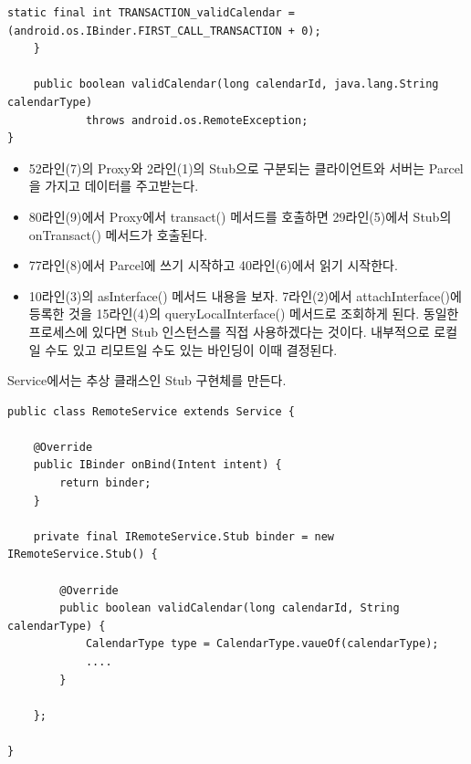 \begin{lstlisting}[frame=single]
		static final int TRANSACTION_validCalendar = (android.os.IBinder.FIRST_CALL_TRANSACTION + 0);
	}

	public boolean validCalendar(long calendarId, java.lang.String calendarType)
			throws android.os.RemoteException;
}
\end{lstlisting}
\begin{itemize}
\item 52라인(7)의 Proxy와 2라인(1)의 Stub으로 구분되는 클라이언트와 서버는 Parcel을 가지고 데이터를 주고받는다. 
\item 80라인(9)에서 Proxy에서 transact() 메서드를 호출하면 29라인(5)에서 Stub의 onTransact() 메서드가 호출된다.
\item 77라인(8)에서 Parcel에 쓰기 시작하고 40라인(6)에서 읽기 시작한다.
\item 10라인(3)의 asInterface() 메서드 내용을 보자. 7라인(2)에서 attachInterface()에 등록한 것을 15라인(4)의 queryLocalInterface() 메서드로 조회하게 된다. 동일한 프로세스에 있다면 Stub 인스턴스를 직접 사용하겠다는 것이다. 내부적으로 로컬일 수도 있고 리모트일 수도 있는 바인딩이 이때 결정된다.
\end{itemize}

Service에서는 추상 클래스인 Stub 구현체를 만든다.
\begin{lstlisting}[frame=single]
public class RemoteService extends Service {

 	@Override
    public IBinder onBind(Intent intent) {
		return binder;
	}
    	
	private final IRemoteService.Stub binder = new IRemoteService.Stub() {
	
		@Override
        public boolean validCalendar(long calendarId, String calendarType) {
			CalendarType type = CalendarType.vaueOf(calendarType);
            ....
        }
        
    }; 
    
}       	
\end{lstlisting}

